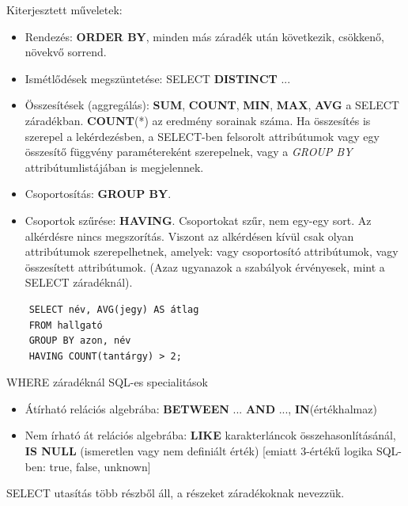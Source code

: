 \documentclass[tikz,12pt,margin=0px]{article}
\begin{document}
	\noindent Kiterjesztett műveletek:
	\begin{itemize}
		\item Rendezés: \textbf{ORDER BY}, minden más záradék után következik, csökkenő, növekvő sorrend.
		\item Ismétlődések megszüntetése: SELECT \textbf{DISTINCT} ...
        \item Összesítések (aggregálás): \textbf{SUM}, \textbf{COUNT}, \textbf{MIN}, \textbf{MAX}, \textbf{AVG} a SELECT záradékban. \textbf{COUNT}(*) az eredmény sorainak száma. Ha összesítés is szerepel a lekérdezésben, a SELECT-ben felsorolt attribútumok vagy egy összesítő függvény paramétereként szerepelnek, vagy a \emph{GROUP BY} attribútumlistájában is megjelennek.
		\item Csoportosítás: \textbf{GROUP BY}.
        \item Csoportok szűrése: \textbf{HAVING}. Csoportokat szűr, nem egy-egy sort. Az alkérdésre nincs megszorítás. Viszont az alkérdésen kívül csak olyan attribútumok szerepelhetnek, amelyek: vagy csoportosító attribútumok, vagy összesített attribútumok. (Azaz ugyanazok a szabályok érvényesek, mint a SELECT záradéknál).
	\end{itemize}
    {\small
    \begin{verbatim}
    SELECT név, AVG(jegy) AS átlag
    FROM hallgató
    GROUP BY azon, név
    HAVING COUNT(tantárgy) > 2;
    \end{verbatim}
    }

    \begin{center}
    \end{center}

	\noindent WHERE záradéknál SQL-es specialitások
	\begin{itemize}
		\item Átírható relációs algebrába: \textbf{BETWEEN} ... \textbf{AND} ..., \textbf{IN}(értékhalmaz)
		\item Nem írható át relációs algebrába: \textbf{LIKE} karakterláncok összehasonlításánál, \textbf{IS NULL} (ismeretlen vagy nem definiált érték) [emiatt 3-értékű logika SQL-ben: true, false, unknown]
	\end{itemize}
\newpage
	\noindent SELECT utasítás több részből áll, a részeket záradékoknak nevezzük.\\
\end{document}
